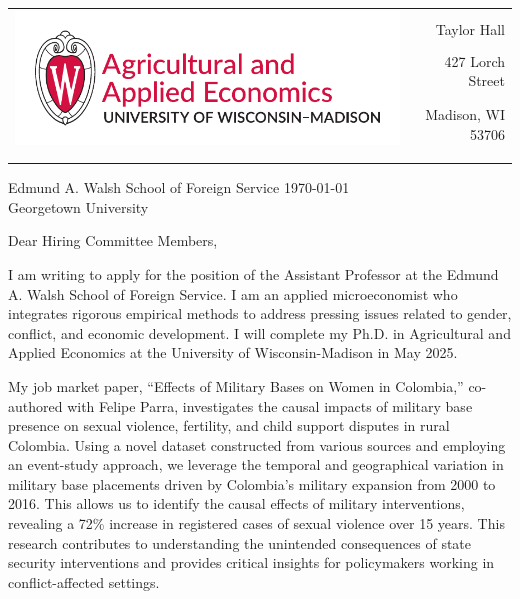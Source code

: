 \documentclass[12pt]{letter}
\begin{document}
\begin{tabularx}{\textwidth}{Xr}
\multirow{4}{*}{\includegraphics[height=3\baselineskip]{logo_cropped.pdf}} &  \\
& Taylor Hall \\
& 427 Lorch Street \\
& Madison, WI 53706 \\
[-1.8ex]\\
\\
\end{tabularx}

Edmund A. Walsh School of Foreign Service \hfill \today \\
Georgetown University

\medskip

Dear Hiring Committee Members,

I am writing to apply for the position of the Assistant Professor 
at the Edmund A. Walsh School of Foreign Service. 
I am an applied microeconomist who integrates rigorous empirical methods to address pressing issues related to gender, conflict, and economic development.
I will complete my Ph.D. in Agricultural and Applied Economics at the University of Wisconsin-Madison in May 2025. 

My job market paper, “Effects of Military Bases on Women in Colombia,” co-authored with Felipe Parra, investigates the causal impacts of military base presence 
on sexual violence, fertility, and child support disputes in rural Colombia. Using a novel dataset constructed from various sources and employing an event-study approach, 
we leverage the temporal and geographical variation in military base placements driven by Colombia's military expansion from 2000 to 2016. This allows us to identify 
the causal effects of military interventions, revealing a 72\% increase in registered cases of sexual violence over 15 years. 
This research contributes to understanding the unintended consequences of state security interventions and provides critical insights 
for policymakers working in conflict-affected settings.
\end{document}
